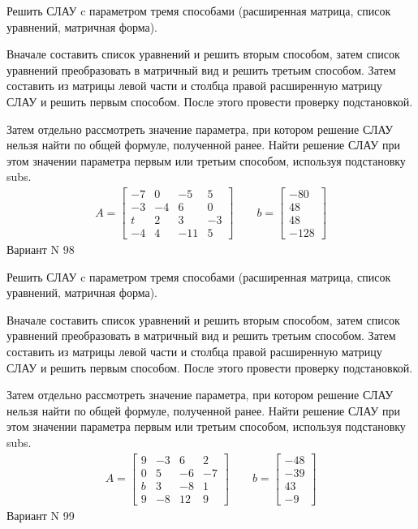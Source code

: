 \documentclass[11pt]{report}
\begin{document}
Решить СЛАУ c параметром тремя способами (расширенная матрица, список уравнений, матричная форма).

Вначале составить список уравнений и решить вторым способом,
затем список уравнений преобразовать в матричный вид и решить третьим способом.
Затем составить из матрицы левой части и столбца правой расширенную матрицу СЛАУ и решить первым способом.
После этого провести проверку подстановкой.

Затем отдельно рассмотреть значение параметра, при котором решение СЛАУ нельзя найти по общей формуле,
полученной ранее.
Найти решение СЛАУ при этом значении параметра первым или третьим способом, используя подстановку subs.
\begin{align*}
    A = \left[\begin{matrix}-7 & 0 & -5 & 5\\-3 & -4 & 6 & 0\\t & 2 & 3 & -3\\-4 & 4 & -11 & 5\end{matrix}\right]
\qquad b = \left[\begin{matrix}-80\\48\\48\\-128\end{matrix}\right]
\end{align*}
\newpage
Вариант N 98


Решить СЛАУ c параметром тремя способами (расширенная матрица, список уравнений, матричная форма).

Вначале составить список уравнений и решить вторым способом,
затем список уравнений преобразовать в матричный вид и решить третьим способом.
Затем составить из матрицы левой части и столбца правой расширенную матрицу СЛАУ и решить первым способом.
После этого провести проверку подстановкой.

Затем отдельно рассмотреть значение параметра, при котором решение СЛАУ нельзя найти по общей формуле,
полученной ранее.
Найти решение СЛАУ при этом значении параметра первым или третьим способом, используя подстановку subs.
\begin{align*}
    A = \left[\begin{matrix}9 & -3 & 6 & 2\\0 & 5 & -6 & -7\\b & 3 & -8 & 1\\9 & -8 & 12 & 9\end{matrix}\right]
\qquad b = \left[\begin{matrix}-48\\-39\\43\\-9\end{matrix}\right]
\end{align*}
\newpage
Вариант N 99
\end{document}
